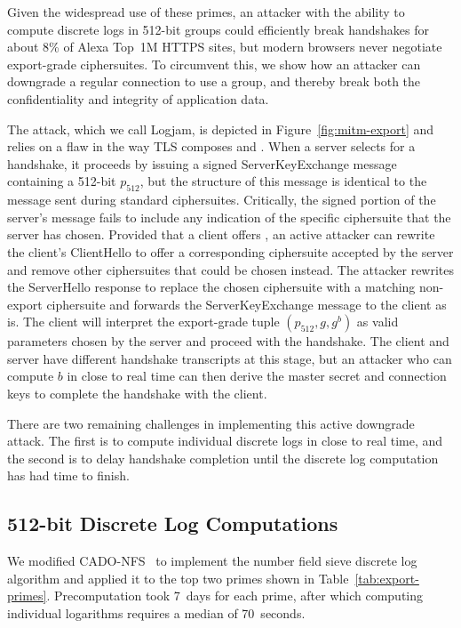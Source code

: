 Given the widespread use of these primes, an attacker with the ability
to compute discrete logs in 512-bit groups could efficiently break
\dheexp{} handshakes for about 8\% of Alexa Top~1M HTTPS sites, but
modern browsers never negotiate export-grade ciphersuites.  To
circumvent this, we show how an attacker can downgrade a regular \dhe{}
connection to use a \dheexp{} group, and thereby break both
the confidentiality and integrity of application data.

The attack, which we call Logjam, is depicted in Figure~\ref{fig:mitm-export} and relies
on a flaw in the way TLS composes \dhe{} and \dheexp{}.
When a server selects \dheexp{} for a handshake, it proceeds by
issuing a signed \textsf{ServerKeyExchange} message containing a
512-bit $p_{512}$, but the structure of this message is identical to the
message sent during standard \dhe{} ciphersuites. Critically, the signed portion of the
server's message fails to include any indication of the specific
ciphersuite that the server has chosen. Provided that a client offers \dhe{}, an
active attacker can rewrite the client's \textsf{ClientHello} to
offer a corresponding \dheexp{} ciphersuite accepted by the server and
remove other ciphersuites that could be chosen instead. The attacker
rewrites the \textsf{ServerHello} response to replace the chosen
\dheexp{} ciphersuite with a matching non-export ciphersuite and
forwards the \textsf{ServerKeyExchange} message to the client as
is. The client will interpret the export-grade tuple $(p_{512}, g, g^b)$ as
valid \dhe{} parameters chosen by the server and proceed with the handshake.
The client and server have different handshake transcripts at this stage,
but an attacker who can compute $b$ in close to real time can then derive the master
secret and connection keys to complete the handshake with the client.

There are two remaining challenges in implementing this active downgrade attack.
The first is to compute individual discrete logs in close to real time, and the second is
to delay handshake completion until the discrete log computation has had time to finish.


\subsection{512-bit Discrete Log Computations}
\label{subsec:512bit-dl-computation}

We modified CADO-NFS~\cite{cado-nfs-2.3} to implement the number field sieve discrete log
algorithm and applied it to the top two \dheexp{} primes shown in
Table~\ref{tab:export-primes}. Precomputation took 7~days for each
prime, after which computing individual logarithms requires a median of
70~seconds.


